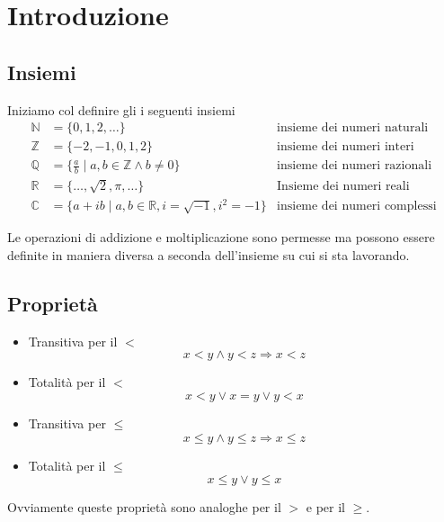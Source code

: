 \chapter{Introduzione}
\section{Insiemi}
Iniziamo col definire gli i seguenti insiemi
\begin{equation*}
	\begin{array}{lll}
		\mathbb{N} & = \{ 0, 1, 2, \dots \}
		           & \text{insieme dei numeri naturali}                              \\
		\mathbb{Z} & = \{ -2, -1, 0, 1, 2 \}
		           & \text{insieme dei numeri interi}                                \\
		\mathbb{Q} & = \{ \frac{a}{b} \mid a, b \in \mathbb{Z} \wedge b \neq 0 \}
		           & \text{insieme dei numeri razionali}                             \\
		\mathbb{R} & = \{ \dots, \sqrt{2}, \pi, \dots \}
		           & \text{Insieme dei numeri reali}                                 \\
		\mathbb{C} & = \{ a + ib \mid a, b \in \mathbb{R}, i = \sqrt{-1}, i^2 = -1\}
		           & \text{insieme dei numeri complessi}
	\end{array}
\end{equation*}

Le operazioni di addizione e moltiplicazione sono permesse ma possono essere definite
in maniera diversa a seconda dell'insieme su cui si sta lavorando.

\section{Propriet\`a}
\begin{itemize}
	\item Transitiva per il $<$
	      \begin{equation*}
		      x < y \wedge y < z \Rightarrow x < z
	      \end{equation*}

	\item Totalit\`a per il $<$
	      \begin{equation*}
		      x < y \vee x = y \vee y < x
	      \end{equation*}

	\item Transitiva per $\leq$
	      \begin{equation*}
		      x \leq y \wedge y \leq z \Rightarrow x \leq z
	      \end{equation*}

	\item Totalit\`a per il $\leq$
	      \begin{equation*}
		      x \leq y \vee y \leq x
	      \end{equation*}
\end{itemize}
Ovviamente queste propriet\`a sono analoghe per il $>$ e per il $\geq$.

